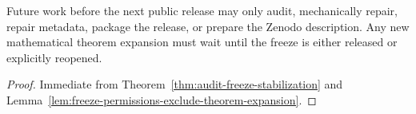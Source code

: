 \begin{corollary}
\label{cor:audit-freeze-working-rule}
Future work before the next public release may only audit, mechanically repair, repair metadata, package the release, or prepare the Zenodo description.  Any new mathematical theorem expansion must wait until the freeze is either released or explicitly reopened.
\end{corollary}

\begin{proof}
Immediate from Theorem~\ref{thm:audit-freeze-stabilization} and Lemma~\ref{lem:freeze-permissions-exclude-theorem-expansion}.
\end{proof}



